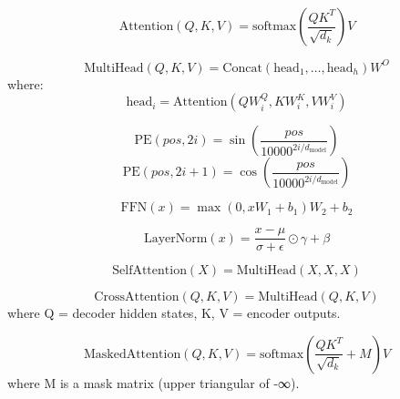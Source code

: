 
\begin{equation}
\text{Attention}(Q, K, V) = \text{softmax}\left( \frac{QK^T}{\sqrt{d_k}} \right) V
\end{equation}

\begin{equation}
\text{MultiHead}(Q, K, V) = \text{Concat}(\text{head}_1, \dots, \text{head}_h) W^O
\end{equation}
where:
\begin{equation}
\text{head}_i = \text{Attention}(Q W_i^Q, K W_i^K, V W_i^V)
\end{equation}

\begin{equation}
\text{PE}(pos, 2i) = \sin\left( \frac{pos}{10000^{2i/d_{\text{model}}}} \right)
\end{equation}
\begin{equation}
\text{PE}(pos, 2i+1) = \cos\left( \frac{pos}{10000^{2i/d_{\text{model}}}} \right)
\end{equation}

\begin{equation}
\text{FFN}(x) = \max(0, xW_1 + b_1) W_2 + b_2
\end{equation}

\begin{equation}
\text{LayerNorm}(x) = \frac{x - \mu}{\sigma + \epsilon} \odot \gamma + \beta
\end{equation}

\begin{equation}
\text{SelfAttention}(X) = \text{MultiHead}(X, X, X)
\end{equation}

\begin{equation}
\text{CrossAttention}(Q, K, V) = \text{MultiHead}(Q, K, V)
\end{equation}
where Q = decoder hidden states, K, V = encoder outputs.

\begin{equation}
\text{MaskedAttention}(Q, K, V) = \text{softmax}\left( \frac{QK^T}{\sqrt{d_k}} + M \right) V
\end{equation}
where M is a mask matrix (upper triangular of -∞).